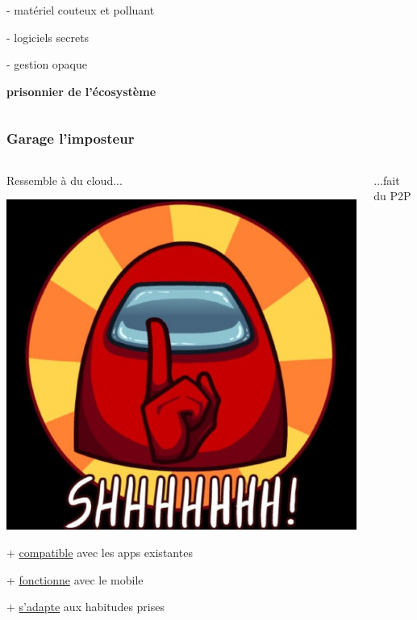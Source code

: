 \documentclass[aspectratio=169]{beamer}
\begin{document}
\begin{frame}[t]
\begin{columns}[t]
\begin{column}{0.5\textwidth}
		- matériel couteux et polluant
	
		- logiciels secrets
	
		- gestion opaque
	
		\vspace{0.2cm}
		\textbf{prisonnier de l'écosystème}
	\end{column}
	\end{columns}
\end{frame}

\begin{frame}[t]
	\frametitle{Garage l'imposteur}

	\begin{columns}[t]
	\begin{column}{0.5\textwidth}
		{\huge Ressemble à du cloud...}
	 
	\begin{center}
		\includegraphics[scale=0.5]{img/shh.jpg}
	\end{center}
	
	+ \underline{compatible} avec les apps existantes
	
	+ \underline{fonctionne} avec le mobile
	
	+ \underline{s'adapte} aux habitudes prises
	
	
	\end{column}
	
	\pause
	\begin{column}{0.5\textwidth}
		{\huge ...fait du P2P}
	

\end{column}
\end{columns}
\end{frame}
\end{document}
